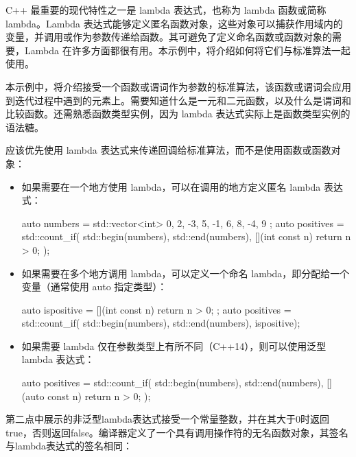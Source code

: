 C++ 最重要的现代特性之一是 lambda 表达式，也称为 lambda 函数或简称 lambda。Lambda 表达式能够定义匿名函数对象，这些对象可以捕获作用域内的变量，并调用或作为参数传递给函数。其可避免了定义命名函数或函数对象的需要，Lambda 在许多方面都很有用。本示例中，将介绍如何将它们与标准算法一起使用。


本示例中，将介绍接受一个函数或谓词作为参数的标准算法，该函数或谓词会应用到迭代过程中遇到的元素上。需要知道什么是一元和二元函数，以及什么是谓词和比较函数。还需熟悉函数类型实例，因为 lambda 表达式实际上是函数类型实例的语法糖。


应该优先使用 lambda 表达式来传递回调给标准算法，而不是使用函数或函数对象：

\begin{itemize}
\item
如果需要在一个地方使用 lambda，可以在调用的地方定义匿名 lambda 表达式：

\begin{cpp}
auto numbers =
    std::vector<int>{ 0, 2, -3, 5, -1, 6, 8, -4, 9 };
auto positives = std::count_if(
    std::begin(numbers), std::end(numbers),
    [](int const n) {return n > 0; });
\end{cpp}

\item
如果需要在多个地方调用 lambda，可以定义一个命名 lambda，即分配给一个变量（通常使用 auto 指定类型）：

\begin{cpp}
auto ispositive = [](int const n) {return n > 0; };
auto positives = std::count_if(
    std::begin(numbers), std::end(numbers), ispositive);
\end{cpp}

\item
如果需要 lambda 仅在参数类型上有所不同（C++14），则可以使用泛型 lambda 表达式：

\begin{cpp}
auto positives = std::count_if(
std::begin(numbers), std::end(numbers),
    [](auto const n) {return n > 0; });
\end{cpp}
\end{itemize}


第二点中展示的非泛型lambda表达式接受一个常量整数，并在其大于0时返回true，否则返回false。编译器定义了一个具有调用操作符的无名函数对象，其签名与lambda表达式的签名相同：

